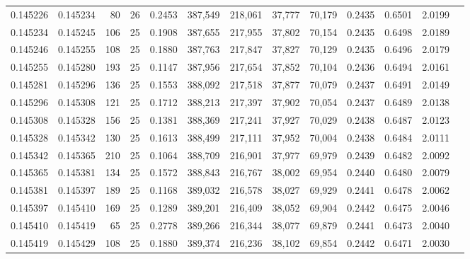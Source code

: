 \begin{tabular}{rrrrrrrrrrrrr}
0.145226 & 0.145234 &    80 &  26 &                                     0.2453 & 387,549 & 218,061 &  37,777 &  70,179 & 0.2435 & 0.6501 & 2.0199 \\
0.145234 & 0.145245 &   106 &  25 &                                     0.1908 & 387,655 & 217,955 &  37,802 &  70,154 & 0.2435 & 0.6498 & 2.0189 \\
0.145246 & 0.145255 &   108 &  25 &                                     0.1880 & 387,763 & 217,847 &  37,827 &  70,129 & 0.2435 & 0.6496 & 2.0179 \\
0.145255 & 0.145280 &   193 &  25 &                                     0.1147 & 387,956 & 217,654 &  37,852 &  70,104 & 0.2436 & 0.6494 & 2.0161 \\
0.145281 & 0.145296 &   136 &  25 &                                     0.1553 & 388,092 & 217,518 &  37,877 &  70,079 & 0.2437 & 0.6491 & 2.0149 \\
0.145296 & 0.145308 &   121 &  25 &                                     0.1712 & 388,213 & 217,397 &  37,902 &  70,054 & 0.2437 & 0.6489 & 2.0138 \\
0.145308 & 0.145328 &   156 &  25 &                                     0.1381 & 388,369 & 217,241 &  37,927 &  70,029 & 0.2438 & 0.6487 & 2.0123 \\
0.145328 & 0.145342 &   130 &  25 &                                     0.1613 & 388,499 & 217,111 &  37,952 &  70,004 & 0.2438 & 0.6484 & 2.0111 \\
0.145342 & 0.145365 &   210 &  25 &                                     0.1064 & 388,709 & 216,901 &  37,977 &  69,979 & 0.2439 & 0.6482 & 2.0092 \\
0.145365 & 0.145381 &   134 &  25 &                                     0.1572 & 388,843 & 216,767 &  38,002 &  69,954 & 0.2440 & 0.6480 & 2.0079 \\
0.145381 & 0.145397 &   189 &  25 &                                     0.1168 & 389,032 & 216,578 &  38,027 &  69,929 & 0.2441 & 0.6478 & 2.0062 \\
0.145397 & 0.145410 &   169 &  25 &                                     0.1289 & 389,201 & 216,409 &  38,052 &  69,904 & 0.2442 & 0.6475 & 2.0046 \\
0.145410 & 0.145419 &    65 &  25 &                                     0.2778 & 389,266 & 216,344 &  38,077 &  69,879 & 0.2441 & 0.6473 & 2.0040 \\
0.145419 & 0.145429 &   108 &  25 &                                     0.1880 & 389,374 & 216,236 &  38,102 &  69,854 & 0.2442 & 0.6471 & 2.0030 \\

\end{tabular}
